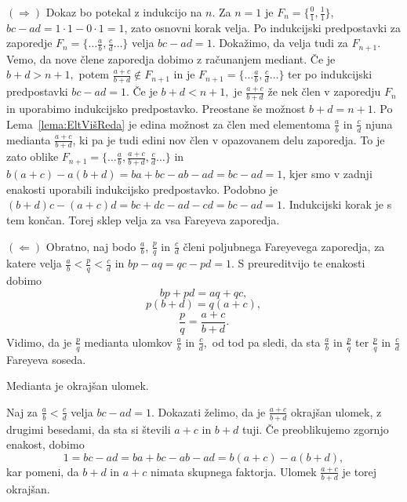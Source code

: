 \documentclass[mat1]{fmfdelo}
\begin{document}
\begin{dokaz}
$(\Rightarrow)$ Dokaz bo potekal z indukcijo na $n$.
Za $n=1$ je $F_n = \{\frac{0}{1}, \frac{1}{1}\}$, $bc - ad = 1\cdot1 - 0\cdot1 = 1$, zato osnovni korak velja.
Po indukcijski predpostavki za zaporedje \( F_n = \{\ldots \frac{a}{b}, \frac{c}{d} \ldots \} \) velja $bc - ad = 1$. Dokažimo, da velja tudi za $F_{n+1}$. Vemo, da nove člene zaporedja dobimo z računanjem mediant. Če je $b+d > n+1,$ potem $\frac{a+c}{b+d} \notin F_{n+1}$ in je \( F_{n+1} = \{\ldots \frac{a}{b}, \frac{c}{d} \ldots \} \) ter po indukcijski predpostavki $bc - ad = 1$. 
Če je $b+d < n+1,$ je $\frac{a+c}{b+d}$ že nek člen v zaporedju $F_n$ in uporabimo indukcijsko predpostavko. 
Preostane še možnost $b+d = n+1$. Po Lema~\ref{lema:EltVišReda} je edina možnost za člen med elementoma $\frac{a}{b}$ in $\frac{c}{d}$ njuna medianta $\frac{a+c}{b+d}$, ki pa je tudi edini nov člen v opazovanem delu zaporedja. To je zato oblike \( F_{n+1} = \{\ldots \frac{a}{b}, \frac{a+c}{b+d}, \frac{c}{d} \ldots \} \) in $b(a + c) - a(b + d) = ba + bc - ab - ad = bc - ad = 1$, kjer smo v zadnji enakosti uporabili indukcijsko predpostavko. Podobno je $(b + d)c - (a + c)d = bc + dc - ad - cd = bc - ad = 1$. Indukcijski korak je s tem končan. Torej sklep velja za vsa Fareyeva zaporedja.

$(\Leftarrow)$ Obratno, naj bodo $\frac{a}{b}$, $\frac{p}{q}$ in $\frac{c}{d}$ členi poljubnega Fareyevega zaporedja, za katere velja $\frac{a}{b} <\frac{p}{q} < \frac{c}{d}$ in $bp - aq = qc - pd = 1$. S preureditvijo te enakosti dobimo
\[ bp + pd = aq + qc, \]
\[ p(b + d) = q(a + c), \]
\[ \frac{p}{q} = \frac{a+c}{b+d}. \]
Vidimo, da je $\frac{p}{q}$ medianta ulomkov $\frac{a}{b}$ in $\frac{c}{d},$ od tod pa sledi, da sta $\frac{a}{b}$ in $\frac{p}{q}$ ter $\frac{p}{q}$ in $\frac{c}{d}$ Fareyeva soseda.
\end{dokaz}

\begin{lema}
\label{lema:MediantaOkrUlom}
Medianta je okrajšan ulomek.
\end{lema}

\begin{dokaz}
Naj za $\frac{a}{b} < \frac{c}{d}$ velja $bc - ad = 1$. Dokazati želimo, da je $\frac{a+c}{b+d}$ okrajšan ulomek, z drugimi besedami, da sta si števili $a+c$ in $b+d$ tuji. Če preoblikujemo zgornjo enakost, dobimo 
\[ 1 = bc - ad = ba + bc - ab - ad = b(a + c) - a(b + d), \]
kar pomeni, da $b+d$ in $a+c$ nimata skupnega faktorja. Ulomek $\frac{a+c}{b+d}$ je torej okrajšan.
\end{dokaz}
\end{document}
